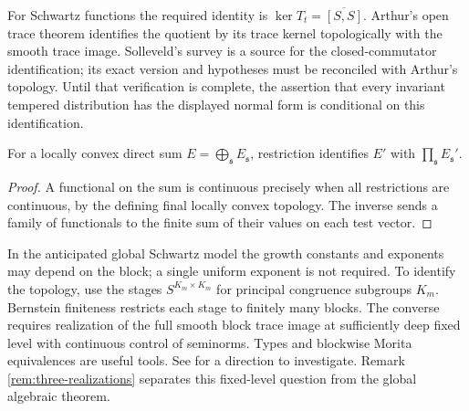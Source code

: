 For Schwartz functions the required identity is $\ker T_t=\overline{[S,S]}$. Arthur's open trace theorem \cite[p.~174]{Ar94} identifies the quotient by its trace kernel topologically with the smooth trace image. Solleveld's survey \cite[Examples 5.10 and 5.12, Theorem 5.14]{So25} is a source for the closed-commutator identification; its exact version and hypotheses must be reconciled with Arthur's topology. Until that verification is complete, the assertion that every invariant tempered distribution has the displayed normal form is conditional on this identification.

\begin{proposition}\label{prop:duality-global}
For a locally convex direct sum $E=\bigoplus_{\mathfrak s}E_{\mathfrak s}$, restriction identifies $E'$ with $\prod_{\mathfrak s}E_{\mathfrak s}'$.
\end{proposition}
\begin{proof}
A functional on the sum is continuous precisely when all restrictions are continuous, by the defining final locally convex topology. The inverse sends a family of functionals to the finite sum of their values on each test vector.
\end{proof}
\begin{center}
\end{center}
In the anticipated global Schwartz model the growth constants and exponents may depend on the block; a single uniform exponent is not required. To identify the topology, use the stages $S^{K_m\times K_m}$ for principal congruence subgroups $K_m$. Bernstein finiteness restricts each stage to finitely many blocks. The converse requires realization of the full smooth block trace image at sufficiently deep fixed level with continuous control of seminorms. Types and blockwise Morita equivalences are useful tools. See \cite{So19} for a direction to investigate. Remark \ref{rem:three-realizations} separates this fixed-level question from the global algebraic theorem.

